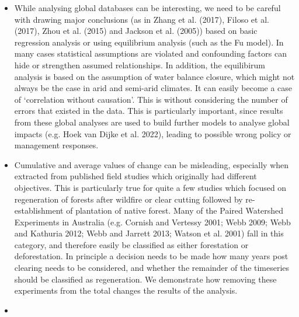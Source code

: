 \documentclass[]{elsarticle} %
\providecommand{\tightlist}{%
  \setlength{\itemsep}{0pt}\setlength{\parskip}{0pt}}
\begin{document}
\begin{itemize}
\tightlist
\item
  While analysing global databases can be interesting, we need to be careful with drawing major conclusions (as in Zhang et al. (2017), Filoso et al. (2017), Zhou et al. (2015) and Jackson et al. (2005)) based on basic regression analysis or using equilibrium analysis (such as the Fu model). In many cases statistical assumptions are violated and confounding factors can hide or strengthen assumed relationships. In addition, the equilibirum analysis is based on the assumption of water balance closure, which might not always be the case in arid and semi-arid climates. It can easily become a case of `correlation without causation'. This is without considering the number of errors that existed in the data. This is particularly important, since results from these global analyses are used to build further models to analyse global impacts (e.g. Hoek van Dijke et al. 2022), leading to possible wrong policy or management responses.\\
\item
  Cumulative and average values of change can be misleading, especially when extracted from published field studies which originally had different objectives. This is particularly true for quite a few studies which focused on regeneration of forests after wildfire or clear cutting followed by re-establishment of plantation of native forest. Many of the Paired Watershed Experiments in Australia (e.g. Cornish and Vertessy 2001; Webb 2009; Webb and Kathuria 2012; Webb and Jarrett 2013; Watson et al. 2001) fall in this category, and therefore easily be classified as either forestation or deforestation. In principle a decision needs to be made how many years post clearing needs to be considered, and whether the remainder of the timeseries should be classified as regeneration. We demonstrate how removing these experiments from the total changes the results of the analysis.
\item

\end{itemize}
\end{document}
